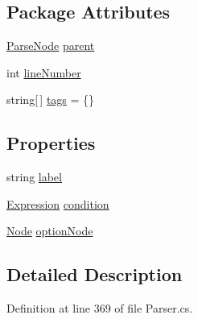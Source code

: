 \subsection*{Package Attributes}
\begin{DoxyCompactItemize}
\item 
\hyperlink{a00150}{Parse\-Node} \hyperlink{a00150_af313a82103fcc2ff5a177dbb06b92f7b}{parent}
\item 
int \hyperlink{a00150_a18b493382de0fde5b4299c1bd2250075}{line\-Number}
\item 
string\mbox{[}$\,$\mbox{]} \hyperlink{a00150_a58b3a15788fd2d4127d73619dc6d04ae}{tags} = \{\}
\end{DoxyCompactItemize}
\subsection*{Properties}
\begin{DoxyCompactItemize}
\item 
string \hyperlink{a00161_ab43ec731479a56891389f6ece87f5f62}{label}
\item 
\hyperlink{a00106}{Expression} \hyperlink{a00161_a31ece7f65af1e43961b68ba0275cdfaf}{condition}
\item 
\hyperlink{a00140}{Node} \hyperlink{a00161_a33d667370031f58b054b79a39891c3f3}{option\-Node}
\end{DoxyCompactItemize}


\subsection{Detailed Description}


Definition at line 369 of file Parser.\-cs.



